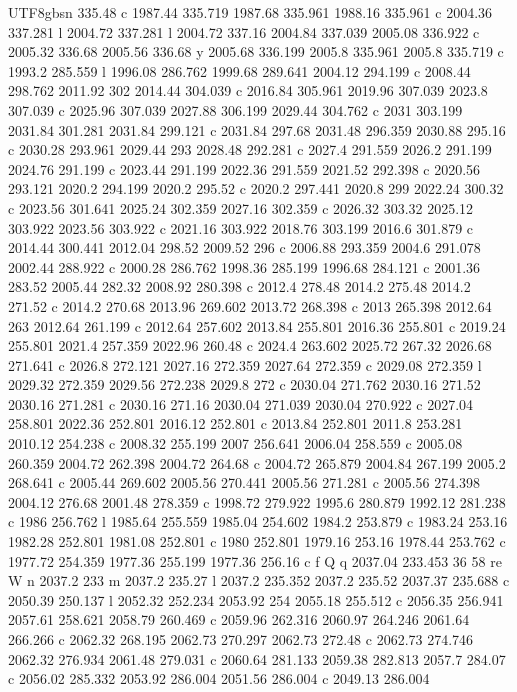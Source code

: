 \documentclass[11pt,a4paper,oneside]{report}
\begin{document}
\begin{CJK*}{UTF8}{gbsn}
{335.48 c 1987.44 335.719 1987.68 335.961 1988.16 335.961 c 2004.36 337.281 l 2004.72 337.281 l 2004.72
337.16 2004.84 337.039 2005.08 336.922 c 2005.32 336.68 2005.56 336.68 y 2005.68 336.199 2005.8 335.961
2005.8 335.719 c 1993.2 285.559 l 1996.08 286.762 1999.68 289.641 2004.12 294.199 c 2008.44 298.762
2011.92 302 2014.44 304.039 c 2016.84 305.961 2019.96 307.039 2023.8 307.039 c 2025.96 307.039 2027.88
306.199 2029.44 304.762 c 2031 303.199 2031.84 301.281 2031.84 299.121 c 2031.84 297.68 2031.48 296.359
2030.88 295.16 c 2030.28 293.961 2029.44 293 2028.48 292.281 c 2027.4 291.559 2026.2 291.199 2024.76
291.199 c 2023.44 291.199 2022.36 291.559 2021.52 292.398 c 2020.56 293.121 2020.2 294.199 2020.2 295.52
c 2020.2 297.441 2020.8 299 2022.24 300.32 c 2023.56 301.641 2025.24 302.359 2027.16 302.359 c 2026.32
303.32 2025.12 303.922 2023.56 303.922 c 2021.16 303.922 2018.76 303.199 2016.6 301.879 c 2014.44 300.441
2012.04 298.52 2009.52 296 c 2006.88 293.359 2004.6 291.078 2002.44 288.922 c 2000.28 286.762 1998.36
285.199 1996.68 284.121 c 2001.36 283.52 2005.44 282.32 2008.92 280.398 c 2012.4 278.48 2014.2 275.48
2014.2 271.52 c 2014.2 270.68 2013.96 269.602 2013.72 268.398 c 2013 265.398 2012.64 263 2012.64 261.199
c 2012.64 257.602 2013.84 255.801 2016.36 255.801 c 2019.24 255.801 2021.4 257.359 2022.96 260.48 c
2024.4 263.602 2025.72 267.32 2026.68 271.641 c 2026.8 272.121 2027.16 272.359 2027.64 272.359 c 2029.08
272.359 l 2029.32 272.359 2029.56 272.238 2029.8 272 c 2030.04 271.762 2030.16 271.52 2030.16 271.281 c
2030.16 271.16 2030.04 271.039 2030.04 270.922 c 2027.04 258.801 2022.36 252.801 2016.12 252.801 c
2013.84 252.801 2011.8 253.281 2010.12 254.238 c 2008.32 255.199 2007 256.641 2006.04 258.559 c 2005.08
260.359 2004.72 262.398 2004.72 264.68 c 2004.72 265.879 2004.84 267.199 2005.2 268.641 c 2005.44 269.602
2005.56 270.441 2005.56 271.281 c 2005.56 274.398 2004.12 276.68 2001.48 278.359 c 1998.72 279.922 1995.6
280.879 1992.12 281.238 c 1986 256.762 l 1985.64 255.559 1985.04 254.602 1984.2 253.879 c 1983.24 253.16
1982.28 252.801 1981.08 252.801 c 1980 252.801 1979.16 253.16 1978.44 253.762 c 1977.72 254.359 1977.36
255.199 1977.36 256.16 c f Q q 2037.04 233.453 36 58 re W n 2037.2 233 m 2037.2 235.27 l 2037.2 235.352
2037.2 235.52 2037.37 235.688 c 2050.39 250.137 l 2052.32 252.234 2053.92 254 2055.18 255.512 c 2056.35
256.941 2057.61 258.621 2058.79 260.469 c 2059.96 262.316 2060.97 264.246 2061.64 266.266 c 2062.32
268.195 2062.73 270.297 2062.73 272.48 c 2062.73 274.746 2062.32 276.934 2061.48 279.031 c 2060.64
281.133 2059.38 282.813 2057.7 284.07 c 2056.02 285.332 2053.92 286.004 2051.56 286.004 c 2049.13 286.004
}
\end{CJK*}
\end{document}
